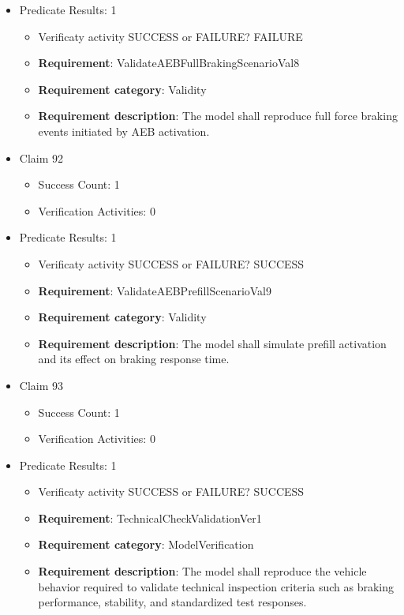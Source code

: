 \documentclass{article}
\begin{document}
\begin{itemize}
									    
				\item Predicate Results: 1
					\begin{itemize}				
					\item Verificaty activity SUCCESS or FAILURE? FAILURE
					
					\item \textbf{Requirement}: ValidateAEBFullBrakingScenarioVal8 
					\item \textbf{Requirement category}: Validity
					\item \textbf{Requirement description}: The model shall reproduce full force braking events initiated by AEB activation.
					\end{itemize}

  				  \item Claim 92
				\begin{itemize}
			    	\item Success Count: 1 
			    	\item Verification Activities: 0
				\end{itemize}
				
									    
				\item Predicate Results: 1
					\begin{itemize}				
					\item Verificaty activity SUCCESS or FAILURE? SUCCESS
					
					\item \textbf{Requirement}: ValidateAEBPrefillScenarioVal9 
					\item \textbf{Requirement category}: Validity
					\item \textbf{Requirement description}: The model shall simulate prefill activation and its effect on braking response time.
					\end{itemize}

  				  \item Claim 93
				\begin{itemize}
			    	\item Success Count: 1 
			    	\item Verification Activities: 0
				\end{itemize}
				
									    
				\item Predicate Results: 1
					\begin{itemize}				
					\item Verificaty activity SUCCESS or FAILURE? SUCCESS
					
					\item \textbf{Requirement}: TechnicalCheckValidationVer1 
					\item \textbf{Requirement category}: ModelVerification
					\item \textbf{Requirement description}: The model shall reproduce the vehicle behavior required to validate technical inspection criteria such as braking performance, stability, and standardized test responses.
					\end{itemize}


\end{itemize}
\end{document}
